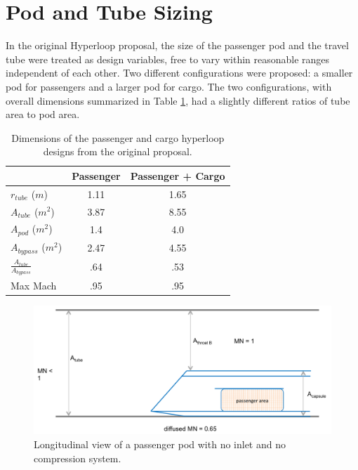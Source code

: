 \documentclass[heading.tex]{subfiles}
\begin{document}
\section{Pod and Tube Sizing}
\label{s:sizing}

In the original Hyperloop proposal, the size of the passenger pod and the travel tube were treated as design variables, 
free to vary within reasonable ranges independent of each other. Two different configurations were proposed: a smaller 
pod for passengers and a larger pod for cargo. The two configurations, with overall dimensions summarized 
in Table \ref{t:hyperbase}, had a slightly different ratios of tube area to pod area. 

\begin{table}
  \centering
  \caption{Dimensions of the passenger and cargo hyperloop designs from the original proposal. }
  \label{t:hyperbase}
  \begin{tabular}{l c c}
    \hline
                                  &  Passenger       & Passenger + Cargo \\ \hline
    $r_{tube}$ ($m$)              &        1.11      &     1.65  \\
    $A_{tube}$  ($m^2$)           &        3.87      &     8.55  \\
    $A_{pod}$ ($m^2$)             &        1.4       &     4.0   \\ 
    $A_{bypass}$ ($m^2$)          &        2.47      &     4.55  \\ 
    $\frac{A_{tube}}{A_{bypass}}$ &        .64       &     .53   \\
    Max Mach                      &        .95       &     .95   \\
    \hline
  \end{tabular}
\end{table}

\begin{figure}[hbtp]
\centering
\includegraphics[width=.85\textwidth]{images/closedCapsule}
\caption{Longitudinal view of a passenger pod with no inlet and no compression system.}
\label{f:ClosedPod}
\end{figure}
\end{document}
